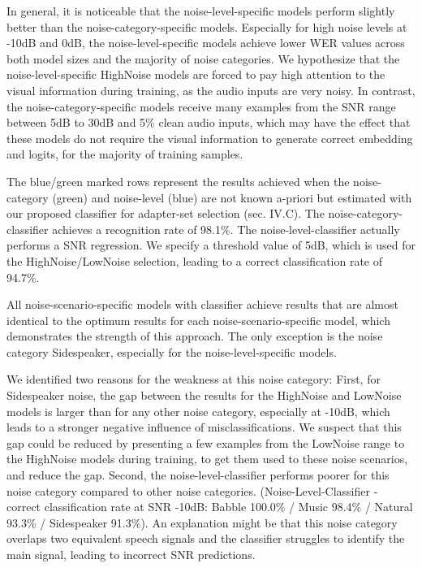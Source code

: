In general, it is noticeable that the noise-level-specific models perform slightly better than the noise-category-specific models. Especially for high noise levels at -10dB and 0dB, the noise-level-specific models achieve lower WER values across both model sizes and the majority of noise categories. We hypothesize that the noise-level-specific HighNoise models are forced to pay high attention to the visual information during training, as the audio inputs are very noisy. In contrast, the noise-category-specific models receive many examples from the SNR range between 5dB to 30dB and 5\% clean audio inputs, which may have the effect that these models do not require the visual information to generate correct embedding and logits, for the majority of training samples.

The blue/green marked rows represent the results achieved when the noise-category (green) and noise-level (blue) are not known a-priori but estimated with our proposed classifier for adapter-set selection (sec. IV.C).
The noise-category-classifier achieves a recognition rate of 98.1\%. The noise-level-classifier actually performs a SNR regression. We specify a threshold value of 5dB, which is used for the HighNoise/LowNoise selection, leading to a correct classification rate of 94.7\%. 

All noise-scenario-specific models with classifier achieve results that are almost identical to the optimum results for each noise-scenario-specific model, which demonstrates the strength of this approach. The only exception is the noise category Sidespeaker, especially for the noise-level-specific models.

We identified two reasons for the weakness at this noise category: First, for Sidespeaker noise, the gap between the results for the HighNoise and LowNoise models is larger than for any other noise category, especially at -10dB, which leads to a stronger negative influence of misclassifications. We suspect that this gap could be reduced by presenting a few examples from the LowNoise range to the HighNoise models during training, to get them used to these noise scenarios, and reduce the gap.
Second, the noise-level-classifier performs poorer for this noise category compared to other noise categories. (Noise-Level-Classifier - correct classification rate at SNR -10dB: Babble 100.0\% / Music 98.4\% / Natural 93.3\% / Sidespeaker 91.3\%). An explanation might be that this noise category overlaps two equivalent speech signals and the classifier struggles to identify the main signal, leading to incorrect SNR predictions.

